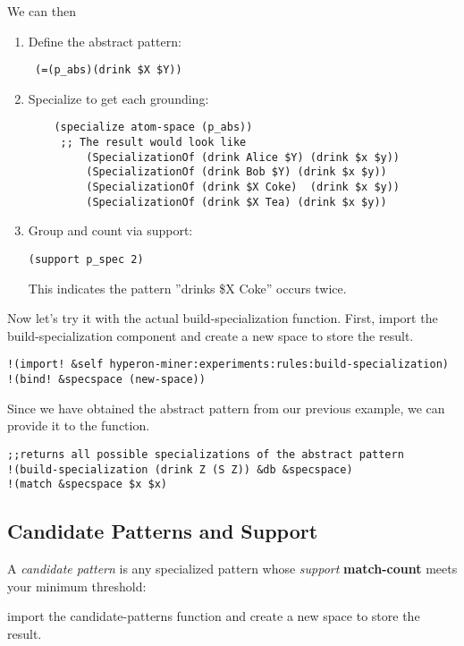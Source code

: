 \documentclass{article}
\begin{document}
We can then

\begin{enumerate}
\item  Define the abstract pattern:
    \begin{verbatim}
 (=(p_abs)(drink $X $Y))
    \end{verbatim}
\item  Specialize to get each grounding:
    \begin{verbatim}
    (specialize atom-space (p_abs))
     ;; The result would look like 
         (SpecializationOf (drink Alice $Y) (drink $x $y))
         (SpecializationOf (drink Bob $Y) (drink $x $y))
         (SpecializationOf (drink $X Coke)  (drink $x $y))
         (SpecializationOf (drink $X Tea) (drink $x $y))
    \end{verbatim}
\item   Group and count via support:
    \begin{verbatim}
(support p_spec 2)
    \end{verbatim}
    This indicates the pattern ''drinks \$X  Coke'' occurs twice.
\end{enumerate}

Now let's try it with the actual build-specialization function.
First, import the build-specialization component and create a new space to store the result.

 \begin{verbatim}
!(import! &self hyperon-miner:experiments:rules:build-specialization)
!(bind! &specspace (new-space))
  \end{verbatim}

Since we have obtained the abstract pattern from our previous example, we can provide it  to the function.

 \begin{verbatim}
;;returns all possible specializations of the abstract pattern
!(build-specialization (drink Z (S Z)) &db &specspace)
!(match &specspace $x $x)
  \end{verbatim}



\subsection{Candidate Patterns and Support}

A \emph{candidate pattern} is any specialized pattern whose \emph{support}  \textbf{match-count} meets your minimum threshold:

import the candidate-patterns function and create a new space to store the result.
\end{document}
